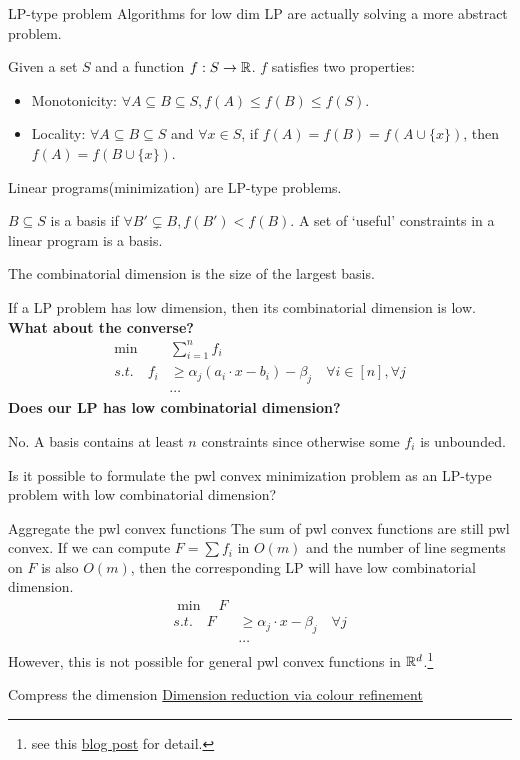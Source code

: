 \documentclass{beamer}
\begin{document}
\begin{frame}[allowframebreaks]{LP-type problem}
    Algorithms for low dim LP are actually solving a more abstract problem.
    \begin{definition}
        Given a set $S$ and a function $f:S\to \R$. $f$ satisfies two properties:%
        \begin{itemize}
            \item Monotonicity: $\forall A\subseteq B\subseteq S, f(A)\leq f(B)\leq f(S)$.
            \item Locality: $\forall A\subseteq B\subseteq S$ and $\forall x\in S$, if $f(A) = f(B) = f(A \cup \{x\})$, then $f(A) = f(B \cup \{x\})$.
        \end{itemize}
    \end{definition}
    Linear programs(minimization) are LP-type problems.

    $B\subseteq S$ is a basis if $\forall B'\subsetneq B, f(B')<f(B)$. A set of `useful' constraints in a linear program is a basis.

    The combinatorial dimension is the size of the largest basis.

    If a LP problem has low dimension, then its combinatorial dimension is low. \textbf{What about the converse?}
    \newpage
    \begin{align*}
        \min &\sum_{i=1}^n f_i\\
        s.t. \quad f_i&\geq \alpha_j(a_i\cdot x -b_i)-\beta_j \quad \forall i\in[n], \forall j\\
        &\cdots
    \end{align*}%
    \textbf{Does our LP has low combinatorial dimension?}
    
    No. A basis contains at least $n$ constraints since otherwise some $f_i$ is unbounded.

    \begin{problem}
        Is it possible to formulate the pwl convex minimization problem as an LP-type problem with low combinatorial dimension?
    \end{problem}
\end{frame}



\begin{frame}{Aggregate the pwl convex functions}
    The sum of pwl convex functions are still pwl convex. 
    \newline If we can compute $F=\sum f_i$ in $O(m)$ and the number of line segments on $F$ is also $O(m)$, then the corresponding LP will have low combinatorial dimension.
    \begin{align*}
        \min \quad F\\
        s.t. \quad F&\geq \alpha_j\cdot x -\beta_j \quad \forall j\\
        &\cdots
    \end{align*}
    However, this is not possible for general pwl convex functions in $\R^d$.\footnote{see this \href{https://talldoor.uk/posts/2024-09-16-piecewise-linear.html}{blog post} for detail.}
\end{frame}

\begin{frame}{Compress the dimension}
    \href{https://arxiv.org/pdf/1307.5697}{Dimension reduction via colour refinement}
\end{frame}
\end{document}
